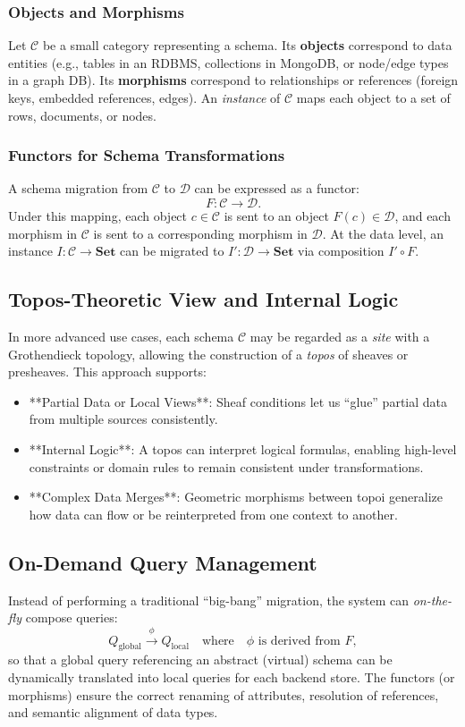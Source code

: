 \documentclass[11pt]{article}
\begin{document}
\subsubsection{Objects and Morphisms}
Let $\mathcal{C}$ be a small category representing a schema. Its \textbf{objects} correspond to data entities (e.g., tables in an RDBMS, collections in MongoDB, or node/edge types in a graph DB). Its \textbf{morphisms} correspond to relationships or references (foreign keys, embedded references, edges). An \emph{instance} of $\mathcal{C}$ maps each object to a set of rows, documents, or nodes.

\subsubsection{Functors for Schema Transformations}
A schema migration from $\mathcal{C}$ to $\mathcal{D}$ can be expressed as a functor:
\[
  F : \mathcal{C} \longrightarrow \mathcal{D}.
\]
Under this mapping, each object $c \in \mathcal{C}$ is sent to an object $F(c) \in \mathcal{D}$, and each morphism in $\mathcal{C}$ is sent to a corresponding morphism in $\mathcal{D}$. At the data level, an instance $I : \mathcal{C} \to \mathbf{Set}$ can be migrated to $I' : \mathcal{D} \to \mathbf{Set}$ via composition $I' \circ F$.

\subsection{Topos-Theoretic View and Internal Logic}
In more advanced use cases, each schema $\mathcal{C}$ may be regarded as a \emph{site} with a Grothendieck topology, allowing the construction of a \emph{topos} of sheaves or presheaves. This approach supports:
\begin{itemize}
\item **Partial Data or Local Views**: Sheaf conditions let us “glue” partial data from multiple sources consistently.
\item **Internal Logic**: A topos can interpret logical formulas, enabling high-level constraints or domain rules to remain consistent under transformations.
\item **Complex Data Merges**: Geometric morphisms between topoi generalize how data can flow or be reinterpreted from one context to another.
\end{itemize}

\subsection{On-Demand Query Management}
Instead of performing a traditional “big-bang” migration, the system can \emph{on-the-fly} compose queries:
\[
   Q_{\text{global}} \xrightarrow{\phi} Q_{\text{local}}
   \quad \text{where} \quad
   \phi \text{ is derived from } F,
\]
so that a global query referencing an abstract (virtual) schema can be dynamically translated into local queries for each backend store. The functors (or morphisms) ensure the correct renaming of attributes, resolution of references, and semantic alignment of data types.
\end{document}
